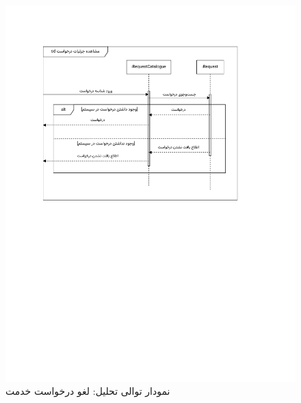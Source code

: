 \begin{figure}[ht!]
	\centering
	\includegraphics[scale=0.8, page=6]{figs/OOD-Sequence-2.pdf}
	\caption{نمودار توالی تحلیل: لغو درخواست خدمت}
\end{figure}
\FloatBarrier
\newpage

